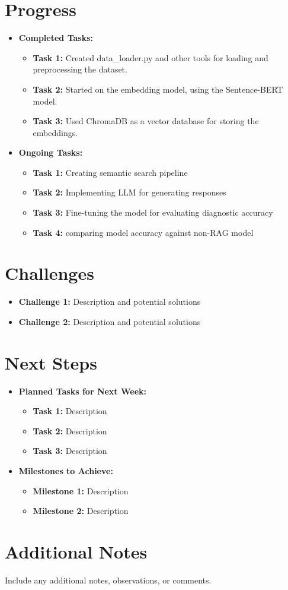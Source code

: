 \documentclass[12pt]{article}
\begin{document}
\section*{Progress}
\begin{itemize}
    \item \textbf{Completed Tasks:}
    \begin{itemize}[leftmargin=*]
        \item \textbf{Task 1:} Created data\_loader.py and other tools for loading and preprocessing the dataset.
        \item \textbf{Task 2:} Started on the embedding model, using the Sentence-BERT model.
        \item \textbf{Task 3:} Used ChromaDB as a vector database for storing the embeddings.
    \end{itemize}
    \item \textbf{Ongoing Tasks:}
    \begin{itemize}[leftmargin=*]
        \item \textbf{Task 1:} Creating semantic search pipeline
        \item \textbf{Task 2:} Implementing LLM for generating responses
        \item \textbf{Task 3:} Fine-tuning the model for evaluating diagnostic accuracy
        \item \textbf{Task 4:} comparing model accuracy against non-RAG model
    \end{itemize}
\end{itemize}

\newpage
\section*{Challenges}
\begin{itemize}[leftmargin=*]
    \item \textbf{Challenge 1:} Description and potential solutions
    \item \textbf{Challenge 2:} Description and potential solutions
\end{itemize}

\section*{Next Steps}
\begin{itemize}
    \item \textbf{Planned Tasks for Next Week:}
    \begin{itemize}[leftmargin=*]
        \item \textbf{Task 1:} Description
        \item \textbf{Task 2:} Description
        \item \textbf{Task 3:} Description
    \end{itemize}
    \item \textbf{Milestones to Achieve:}
    \begin{itemize}[leftmargin=*]
        \item \textbf{Milestone 1:} Description
        \item \textbf{Milestone 2:} Description
    \end{itemize}
\end{itemize}

\section*{Additional Notes}
Include any additional notes, observations, or comments.
\end{document}
